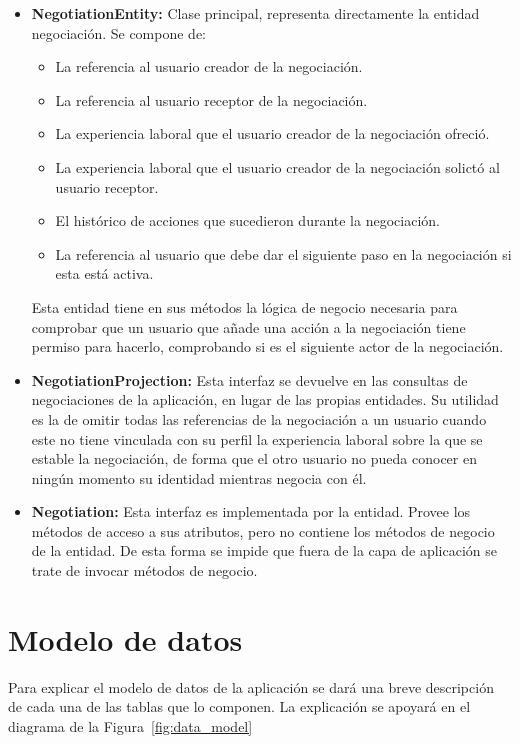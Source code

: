 \documentclass[a4paper, 12pt]{book}
\begin{document}
	\begin{itemize}
	\item \textbf{NegotiationEntity:} Clase principal, representa directamente la entidad negociación.
	Se compone de:
		\begin{itemize}
		\item La referencia al usuario creador de la negociación.
		\item La referencia al usuario receptor de la negociación.
		\item La experiencia laboral que el usuario creador de la negociación ofreció.
		\item La experiencia laboral que el usuario creador de la negociación solictó al usuario receptor.
		\item El histórico de acciones que sucedieron durante la negociación.
		\item La referencia al usuario que debe dar el siguiente paso en la negociación si esta está activa.
		\end{itemize}
	Esta entidad tiene en sus métodos la lógica de negocio necesaria para comprobar que un usuario que añade una acción a la negociación tiene permiso para hacerlo, comprobando si es el siguiente actor de la negociación.
	\item \textbf{NegotiationProjection:} Esta interfaz se devuelve en las consultas de negociaciones de la aplicación, en lugar de las propias entidades.
	 Su utilidad es la de omitir todas las referencias de la negociación a un usuario cuando este no tiene vinculada con su perfil la experiencia laboral sobre la que se estable la negociación, de forma que el otro usuario no pueda conocer en ningún momento su identidad mientras negocia con él.
	\item \textbf{Negotiation:} Esta interfaz es implementada por la entidad. Provee los métodos de acceso a sus atributos, pero no contiene los métodos de negocio de la entidad. De esta forma se impide que fuera de la capa de aplicación se trate de invocar métodos de negocio.
	\end{itemize}



\section{Modelo de datos}
\label{sec:data_model}
Para explicar el modelo de datos de la aplicación se dará una breve descripción de cada una de las tablas que lo componen. La explicación se apoyará en el diagrama de la Figura~\ref{fig:data_model}
\end{document}

